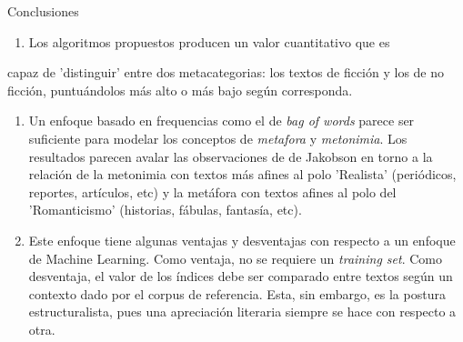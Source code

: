 \documentclass[presentation]{beamer}
\begin{document}
\begin{frame}[label={sec:org598fd67}]{Conclusiones}
\begin{enumerate}
\item Los algoritmos propuestos producen un valor cuantitativo que es
\end{enumerate}
capaz de 'distinguir' entre dos metacategorias: los textos de
ficción y los de no ficción, puntuándolos más alto o más bajo
según corresponda.

\begin{enumerate}
\item Un enfoque basado en frequencias como el de \emph{bag of words} parece
ser suficiente para modelar los conceptos de \emph{metafora} y
\emph{metonimia}.  Los resultados parecen avalar las observaciones de de
Jakobson en torno a la relación de la metonimia con textos más
afines al polo 'Realista' (periódicos, reportes, artículos, etc) y
la metáfora con textos afines al polo del 'Romanticismo'
(historias, fábulas, fantasía, etc).

\item Este enfoque tiene algunas ventajas y desventajas con respecto a un
enfoque de Machine Learning. Como ventaja, no se requiere un
\emph{training set}. Como desventaja, el valor de los índices debe ser
comparado entre textos según un contexto dado por el corpus de
referencia. Esta, sin embargo, es la postura estructuralista, pues
una apreciación literaria siempre se hace con respecto a otra.
\end{enumerate}



 
\end{frame}
\end{document}
